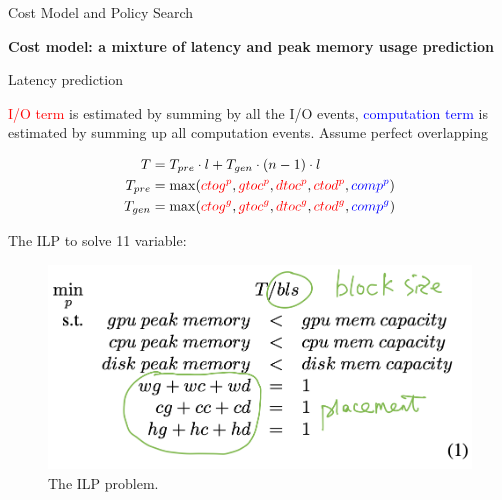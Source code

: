 \begin{frame}{Cost Model and Policy Search}

    \small{\textbf{Cost model: a mixture of latency and peak memory usage prediction}}

    \begin{itemize}
        \footnotesize{
        \item Latency prediction
        \begin{enumerate}
            \footnotesize{
            \item \textcolor{red}{I/O term} is estimated by summing by all the I/O events, \textcolor{blue}{computation term} is estimated by summing up all computation events. Assume perfect overlapping}
        \end{enumerate}
        \begin{align*}
            T &= T_{pre}\cdot l+ T_{gen} \cdot (n-1) \cdot l \\
            T_{pre} &= \max(\textcolor{red}{ctog^p}, \textcolor{red}{gtoc^p}, \textcolor{red}{dtoc^p}, \textcolor{red}{ctod^p}, \textcolor{blue}{comp^p}) \\
            T_{gen} &= \max(\textcolor{red}{ctog^g}, \textcolor{red}{gtoc^g},\textcolor{red}{dtoc^g},\textcolor{red}{ctod^g}, \textcolor{blue}{comp^g})
        \end{align*}
        }
        \item The ILP to solve 11 variable:
        \begin{figure}
            \centering
            \includegraphics[width=.5\textwidth]{./images/ILP.png}
            \caption{The ILP problem.}
        \end{figure}  
    \end{itemize}
\end{frame}